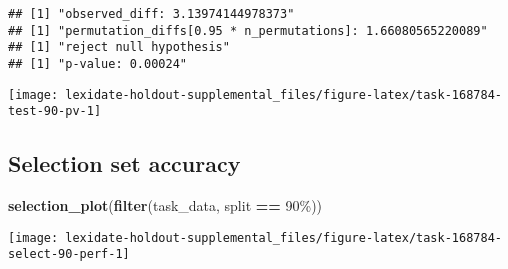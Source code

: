 \documentclass[
]{book}
\newenvironment{Shaded}{\begin{snugshade}}{\end{snugshade}}
\newcommand{\AttributeTok}[1]{\textcolor[rgb]{0.13,0.29,0.53}{#1}}
\newcommand{\DecValTok}[1]{\textcolor[rgb]{0.00,0.00,0.81}{#1}}
\newcommand{\FunctionTok}[1]{\textcolor[rgb]{0.13,0.29,0.53}{\textbf{#1}}}
\newcommand{\NormalTok}[1]{#1}
\newcommand{\OtherTok}[1]{\textcolor[rgb]{0.56,0.35,0.01}{#1}}
\newcommand{\SpecialCharTok}[1]{\textcolor[rgb]{0.81,0.36,0.00}{\textbf{#1}}}
\newcommand{\StringTok}[1]{\textcolor[rgb]{0.31,0.60,0.02}{#1}}
\begin{document}
\begin{Shaded}
\end{Shaded}

\begin{verbatim}
## [1] "observed_diff: 3.13974144978373"
## [1] "permutation_diffs[0.95 * n_permutations]: 1.66080565220089"
## [1] "reject null hypothesis"
## [1] "p-value: 0.00024"
\end{verbatim}

\texttt{[image: lexidate-holdout-supplemental\_files/figure-latex/task-168784-test-90-pv-1]}

\hypertarget{selection-set-accuracy-53}{%
\subsection{Selection set accuracy}\label{selection-set-accuracy-53}}

\begin{Shaded}
\begin{Highlighting}[]
\FunctionTok{selection\_plot}\NormalTok{(}\FunctionTok{filter}\NormalTok{(task\_data, split }\SpecialCharTok{==} \StringTok{\textquotesingle{}90\%\textquotesingle{}}\NormalTok{))}
\end{Highlighting}
\end{Shaded}

\texttt{[image: lexidate-holdout-supplemental\_files/figure-latex/task-168784-select-90-perf-1]}
\end{document}
